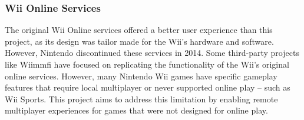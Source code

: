 \subsubsection{Wii Online Services}
The original Wii Online services offered a better user experience than this
project, as its design was tailor made for the Wii's hardware and software.
However, Nintendo discontinued these services in
2014\cite{nintendoTerminationNintendo}. Some third-party projects like Wiimmfi\cite{wiimmfi}
have focused on replicating the functionality of the Wii’s original online
services. However, many Nintendo Wii games have specific gameplay features that
require local multiplayer or never supported online play -- such as Wii Sports.
This project aims to address this limitation by enabling remote multiplayer
experiences for games that were not designed for online play.
